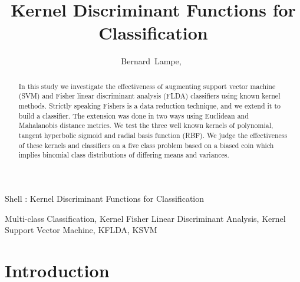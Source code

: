 \documentclass[journal]{IEEEtran}
\begin{document}
\title{Kernel Discriminant Functions for Classification}

\author{Bernard~Lampe,~}

{Shell \MakeLowercase{\Lampe}: Kernel Discriminant Functions for Classification}

\maketitle

\begin{abstract}
In this study we investigate the effectiveness of augmenting support vector machine (SVM) and Fisher linear discriminant analysis (FLDA) classifiers using known kernel methods. Strictly speaking Fishers is a data reduction technique, and we extend it to build a classifier. The extension was done in two ways using Euclidean and Mahalanobis distance metrics. We test the three well known kernels of polynomial, tangent hyperbolic sigmoid and radial basis function (RBF). We judge the effectiveness of these kernels and classifiers on a five class problem based on a biased coin which implies binomial class distributions of differing means and variances.
\end{abstract}

\begin{IEEEkeywords}
Multi-class Classification, Kernel Fisher Linear Discriminant Analysis, Kernel Support Vector Machine, KFLDA, KSVM
\end{IEEEkeywords}

\section{Introduction}
\end{document}
